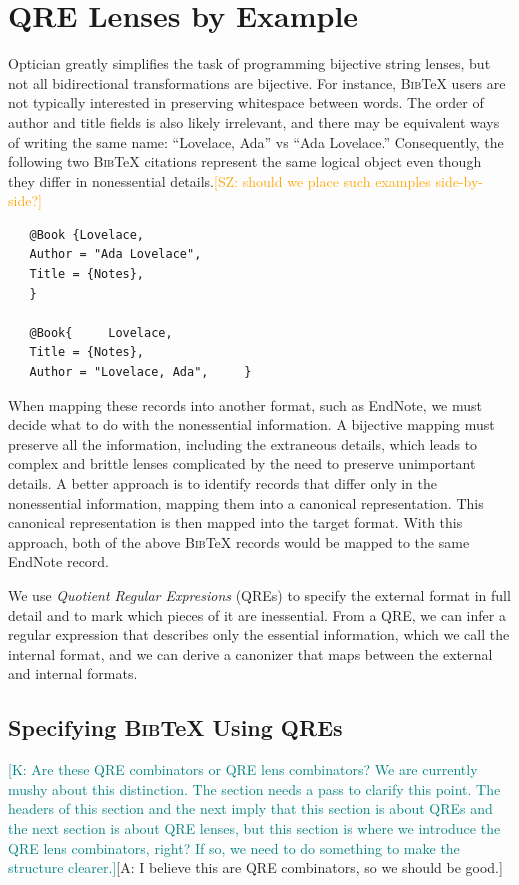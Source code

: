 \documentclass[acmsmall,review,anonymous]{acmart}
\newcommand{\FINISH}[3]{\ifdraft\textcolor{#1}{[#2: #3]}\fi}
\newcommand{\afm}[1]{\FINISH{dkgreen}{A}{#1}}
\newcommand{\saz}[1]{\FINISH{orange}{SZ}{#1}}
\newcommand{\ksf}[1]{\FINISH{teal}{K}{#1}}
\newcommand{\bibtex}{\textsc{Bib}\TeX{}}
\begin{document}
\section{QRE Lenses by Example}
\label{sec:example}

Optician greatly simplifies the task of programming bijective
string lenses, but not all bidirectional transformations are
bijective.  For instance, \bibtex{} users are not typically interested
in preserving whitespace between words.  The order of author and title
fields is also likely irrelevant, and there may be equivalent ways of
writing the same name: ``Lovelace, Ada'' vs ``Ada Lovelace.''
Consequently, the following two \bibtex{} citations represent the same
logical object even though they differ in nonessential details.\saz{should we
  place such examples side-by-side?}
\begin{verbatim}
   @Book {Lovelace,
   Author = "Ada Lovelace",
   Title = {Notes},
   }

   @Book{     Lovelace,
   Title = {Notes},
   Author = "Lovelace, Ada",     }
\end{verbatim}

When mapping these records into another format, such as EndNote, we
must decide what to do with the nonessential information.  A bijective
mapping must preserve all the information, including the extraneous
details, which leads to complex and brittle lenses complicated by the
need to preserve unimportant details.  
A better approach is to identify records that differ only in the
nonessential information, mapping them into a canonical representation.
This canonical representation is then mapped into the target format.
With this approach, both of the above \bibtex{} records would be
mapped to the same EndNote record.

We use {\em Quotient Regular Expresions} (QREs) to specify the
external format in full detail and to mark which pieces of it are
inessential.  From a QRE, we can infer a regular expression that
describes only the essential information, which we call the internal
format, and we can derive a canonizer that maps between the external
and internal formats.


\subsection{Specifying \bibtex{} Using QREs}
\label{subsec:qre-expressions}
\ksf{Are these QRE combinators or QRE lens combinators?  
We are currently mushy about this distinction.  
The section needs a pass to clarify this point.
The headers of this section and the next imply that this section is
about QREs and the next section is about QRE lenses, but this section
is where we introduce the QRE lens combinators, right?  If so, we need
to do something to make the structure clearer.}\afm{I believe this are QRE
combinators, so we should be good.}
\end{document}
